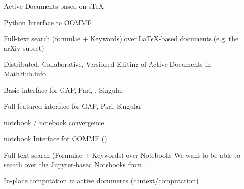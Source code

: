 \begin{workpackage}
\begin{wpdelivs}
  \begin{wpdeliv}[id=adstex,due=6,nature=R,dissem=PU]
    {Active Documents based on sTeX}
  \end{wpdeliv}
  \begin{wpdeliv}[due=9,id=oommf-py,dissem=PU,nature=O,lead=USO]
      {Python Interface to OOMMF}
    \end{wpdeliv}
    \begin{wpdeliv}[id=mws,due=9,nature=O,dissem=PU]
      {Full-text search (formulae + Keywords) over LaTeX-based documents
        (e.g. the arXiv subset)}
    \end{wpdeliv}
    \begin{wpdeliv}[id=mathhub-editing,due=12,nature=DEM,dissem=PU]
      {Distributed, Collaborative, Versioned Editing of Active Documents
        in MathHub.info}
    \end{wpdeliv}
  \begin{wpdeliv}[due=12,id=ipython-kernels-basic,dissem=PU,nature=O]
      {Basic \Jupyter interface for GAP, Pari, \Sage, Singular}
  \end{wpdeliv}

  \begin{wpdeliv}[due=12,id=ipython-kernels,dissem=PU,nature=O]
      {Full featured \Jupyter interface for GAP, Pari, Singular}
  \end{wpdeliv}

  \begin{wpdeliv}[due=12,id=ipython-kernel-sage,dissem=PU,nature=DEM]
      {\Sage notebook / \Jupyter notebook convergence}
  \end{wpdeliv}

    \begin{wpdeliv}[due=15,id=oommf-nb,dissem=PU,nature=DEM,lead=USO]
      {\Jupyter notebook Interface for OOMMF (\OOMMFNB{})}
    \end{wpdeliv}

    \begin{wpdeliv}[id=notebooksearch,due=18,nature=O,dissem=PU]
      {Full-text search (Formulae + Keywords) over Notebooks}
      We want to be able to search over the Jupyter-based Notebooks from
      .
\end{wpdeliv}

    \begin{wpdeliv}[id=adcomp,due=18,nature=DEM,dissem=PU]
      {In-place computation in active documents (context/computation)}
    \end{wpdeliv}


\end{wpdelivs}
\end{workpackage}
